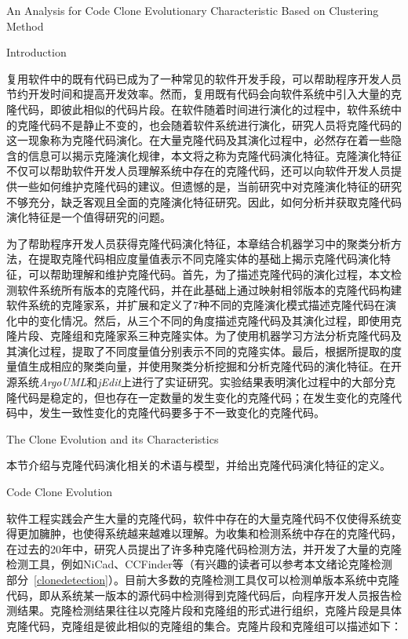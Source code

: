 
{An Analysis for Code Clone Evolutionary Characteristic Based on Clustering Method}

{Introduction}

复用软件中的既有代码已成为了一种常见的软件开发手段，可以帮助程序开发人员节约开发时间和提高开发效率。然而，复用既有代码会向软件系统中引入大量的克隆代码，即彼此相似的代码片段。在软件随着时间进行演化的过程中，软件系统中的克隆代码不是静止不变的，也会随着软件系统进行演化，研究人员将克隆代码的这一现象称为克隆代码演化。在大量克隆代码及其演化过程中，必然存在着一些隐含的信息可以揭示克隆演化规律，本文将之称为克隆代码演化特征。克隆演化特征不仅可以帮助软件开发人员理解系统中存在的克隆代码，还可以向软件开发人员提供一些如何维护克隆代码的建议。但遗憾的是，当前研究中对克隆演化特征的研究不够充分，缺乏客观且全面的克隆演化特征研究。因此，如何分析并获取克隆代码演化特征是一个值得研究的问题。

为了帮助程序开发人员获得克隆代码演化特征，本章结合机器学习中的聚类分析方法，在提取克隆代码相应度量值表示不同克隆实体的基础上揭示克隆代码演化特征，可以帮助理解和维护克隆代码。首先，为了描述克隆代码的演化过程，本文检测软件系统所有版本的克隆代码，并在此基础上通过映射相邻版本的克隆代码构建软件系统的克隆家系，并扩展和定义了7种不同的克隆演化模式描述克隆代码在演化中的变化情况。然后，从三个不同的角度描述克隆代码及其演化过程，即使用克隆片段、克隆组和克隆家系三种克隆实体。为了使用机器学习方法分析克隆代码及其演化过程，提取了不同度量值分别表示不同的克隆实体。最后，根据所提取的度量值生成相应的聚类向量，并使用聚类分析挖掘和分析克隆代码的演化特征。在开源系统{\em ArgoUML}和{\em jEdit}上进行了实证研究。实验结果表明演化过程中的大部分克隆代码是稳定的，但也存在一定数量的发生变化的克隆代码；在发生变化的克隆代码中，发生一致性变化的克隆代码要多于不一致变化的克隆代码。

{The Clone Evolution and its Characteristics}

本节介绍与克隆代码演化相关的术语与模型，并给出克隆代码演化特征的定义。

{Code Clone Evolution}

软件工程实践会产生大量的克隆代码，软件中存在的大量克隆代码不仅使得系统变得更加臃肿，也使得系统越来越难以理解。为收集和检测系统中存在的克隆代码，在过去的20年中，研究人员提出了许多种克隆代码检测方法，并开发了大量的克隆检测工具，例如NiCad\cite{roy2008nicad}、CCFinder\cite{kamiya2002ccfinder}等（有兴趣的读者可以参考本文绪论克隆检测部分~\ref{clonedetection}）。目前大多数的克隆检测工具仅可以检测单版本系统中克隆代码，即从系统某一版本的源代码中检测得到克隆代码后，向程序开发人员报告检测结果。克隆检测结果往往以克隆片段和克隆组的形式进行组织，克隆片段是具体克隆代码，克隆组是彼此相似的克隆组的集合。克隆片段和克隆组可以描述如下：\\

